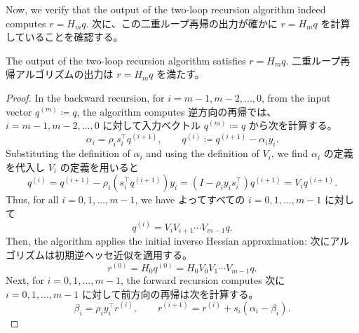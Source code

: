 \documentclass[0_main]{subfiles}
\begin{document}


\ifEn
    Now, we verify that the output of the two-loop recursion algorithm indeed computes $r = H_m q$.
\else
    次に、この二重ループ再帰の出力が確かに $r = H_m q$ を計算していることを確認する。
\fi
\begin{proposition}
    \ifEn
        The output of the two-loop recursion algorithm satisfies $r = H_m q$.
    \else
        二重ループ再帰アルゴリズムの出力は $r = H_m q$ を満たす。
    \fi
\end{proposition}
\begin{proof}
    \ifEn
        In the backward recursion, for $i = m-1, m-2, \dots, 0$, from the input vector $q^{(m)} \coloneqq q$, the algorithm computes
    \else
        逆方向の再帰では、$i = m-1, m-2, \dots, 0$ に対して入力ベクトル $q^{(m)} \coloneqq q$ から次を計算する。
    \fi
    \begin{equation*}
        \alpha_i   = \rho_i s_i^\top q^{(i+1)}, \qquad
        q^{(i)} \coloneqq q^{(i+1)} - \alpha_i y_i.
    \end{equation*}
    \ifEn
        Substituting the definition of $\alpha_i$ and using the definition of $V_i$, we find
    \else
        $\alpha_i$ の定義を代入し $V_i$ の定義を用いると
    \fi
    \begin{equation*}
        q^{(i)} = q^{(i+1)} - \rho_i \left(s_i^\top q^{(i+1)}\right) y_i = \left(I - \rho_i y_i s_i^\top\right) q^{(i+1)} = V_i q^{(i+1)}.
    \end{equation*}
    \ifEn
        Thus, for all $i = 0, 1, \dots, m-1$, we have
    \else
        よってすべての $i = 0, 1, \dots, m-1$ に対して
    \fi
    \begin{equation*}
        q^{(i)} = V_i V_{i+1} \cdots V_{m-1} q.
    \end{equation*}
    \ifEn
        Then, the algorithm applies the initial inverse Hessian approximation:
    \else
        次にアルゴリズムは初期逆ヘッセ近似を適用する。
    \fi
    \begin{equation*}
        r^{(0)} = H_0 q^{(0)} = H_0 V_0 V_1 \cdots V_{m-1} q.
    \end{equation*}
    \ifEn
        Next, for $i = 0, 1, \dots, m-1$, the forward recursion computes
    \else
        次に $i = 0, 1, \dots, m-1$ に対して前方向の再帰は次を計算する。
    \fi
    \begin{equation*}
        \beta_i     = \rho_i y_i^\top r^{(i)}, \qquad
        r^{(i+1)}   = r^{(i)} + s_i \left(\alpha_i - \beta_i\right).
    \end{equation*}

\end{proof}
\end{document}
